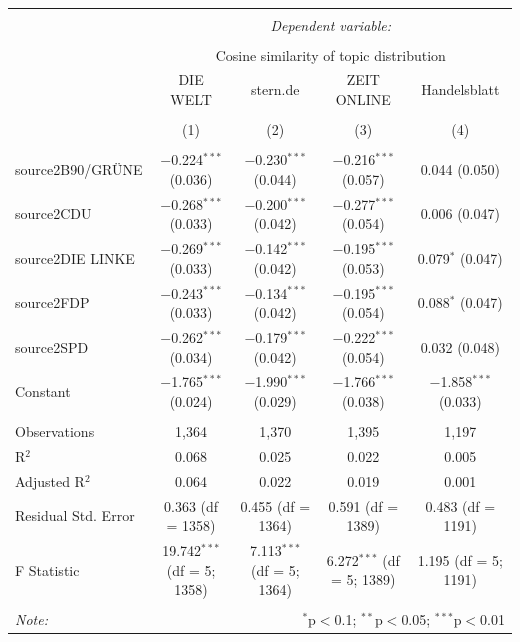 \documentclass[
]{article}
\begin{document}
\begin{table}[!htbp] \centering 
  \caption{} 
  \label{} 
\tiny 
\begin{tabular}{@{\extracolsep{5pt}}lcccc} 
\\[-1.8ex]\hline 
\hline \\[-1.8ex] 
 & \multicolumn{4}{c}{\textit{Dependent variable:}} \\ 
\cline{2-5} 
\\[-1.8ex] & \multicolumn{4}{c}{Cosine similarity of topic distribution} \\ 
 & DIE WELT & stern.de & ZEIT ONLINE & Handelsblatt \\ 
\\[-1.8ex] & (1) & (2) & (3) & (4)\\ 
\hline \\[-1.8ex] 
 source2B90/GRÜNE & $-$0.224$^{***}$ (0.036) & $-$0.230$^{***}$ (0.044) & $-$0.216$^{***}$ (0.057) & 0.044 (0.050) \\ 
  source2CDU & $-$0.268$^{***}$ (0.033) & $-$0.200$^{***}$ (0.042) & $-$0.277$^{***}$ (0.054) & 0.006 (0.047) \\ 
  source2DIE LINKE & $-$0.269$^{***}$ (0.033) & $-$0.142$^{***}$ (0.042) & $-$0.195$^{***}$ (0.053) & 0.079$^{*}$ (0.047) \\ 
  source2FDP & $-$0.243$^{***}$ (0.033) & $-$0.134$^{***}$ (0.042) & $-$0.195$^{***}$ (0.054) & 0.088$^{*}$ (0.047) \\ 
  source2SPD & $-$0.262$^{***}$ (0.034) & $-$0.179$^{***}$ (0.042) & $-$0.222$^{***}$ (0.054) & 0.032 (0.048) \\ 
  Constant & $-$1.765$^{***}$ (0.024) & $-$1.990$^{***}$ (0.029) & $-$1.766$^{***}$ (0.038) & $-$1.858$^{***}$ (0.033) \\ 
 \hline \\[-1.8ex] 
Observations & 1,364 & 1,370 & 1,395 & 1,197 \\ 
R$^{2}$ & 0.068 & 0.025 & 0.022 & 0.005 \\ 
Adjusted R$^{2}$ & 0.064 & 0.022 & 0.019 & 0.001 \\ 
Residual Std. Error & 0.363 (df = 1358) & 0.455 (df = 1364) & 0.591 (df = 1389) & 0.483 (df = 1191) \\ 
F Statistic & 19.742$^{***}$ (df = 5; 1358) & 7.113$^{***}$ (df = 5; 1364) & 6.272$^{***}$ (df = 5; 1389) & 1.195 (df = 5; 1191) \\ 
\hline 
\hline \\[-1.8ex] 
\textit{Note:}  & \multicolumn{4}{r}{$^{*}$p$<$0.1; $^{**}$p$<$0.05; $^{***}$p$<$0.01} \\ 
\end{tabular} 
\end{table}
\end{document}
